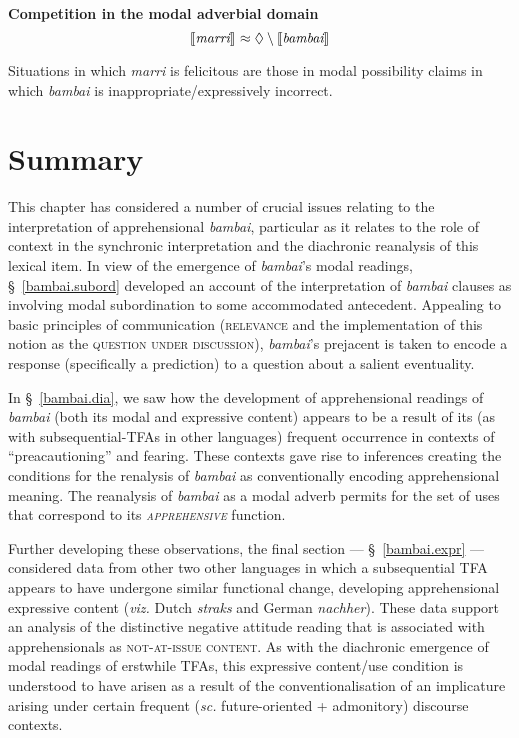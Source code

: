\pex \textbf{Competition in the modal adverbial domain} $$\llbracket{\textit{marri}}\rrbracket^{}\approx\lozenge\setminus\llbracket{\textit{bambai}}\rrbracket^{}$$

Situations in which \textit{marri} is felicitous are those in modal possibility claims in which \textit{bambai} is inappropriate/expressively incorrect.

\xe

\section{Summary}


This chapter has considered a number of crucial issues relating to the interpretation of apprehensional \textit{bambai}, particular as it relates to the role of context in the synchronic interpretation and the diachronic reanalysis of this lexical item. In view of the emergence of \textit{bambai}'s modal readings, \S~\ref{bambai.subord} developed an account of the interpretation of \textit{bambai} clauses as involving modal subordination to some accommodated antecedent. Appealing to basic principles of communication (\textsc{relevance} and the implementation of this notion as the \textsc{question under discussion}), \textit{bambai}'s prejacent is taken to encode a response (specifically a prediction) to a question about a salient eventuality.


In §~\ref{bambai.dia}, we saw how the development of apprehensional readings of \textit{bambai} (both its modal and expressive content) appears to be a result of its (as with subseq\-uential-TFAs in other languages) frequent occurrence in contexts of ``preacautioning'' and fearing. These contexts gave rise to inferences creating the conditions for the renalysis of \textit{bambai} as conventionally encoding apprehensional meaning. The reanalysis of \textit{bambai} as a modal adverb permits for the set of uses that correspond to its \textit{\textsc{apprehensive}} function.

Further developing these observations, the final section --- \S~\ref{bambai.expr} --- considered data from other two other languages in which a subsequential TFA appears to have undergone similar functional change, developing apprehensional expressive content (\textit{viz.} Dutch \textit{straks} and German \textit{nachher}). These data support an analysis of the distinctive negative attitude reading that is associated with apprehensionals as \textsc{not-at-issue content}. As with the diachronic emergence of modal readings of erstwhile TFAs, this expressive content/use condition is understood to have arisen as a result of the conventionalisation of an implicature arising under certain frequent (\textit{sc. }future-oriented + admonitory) discourse contexts.

